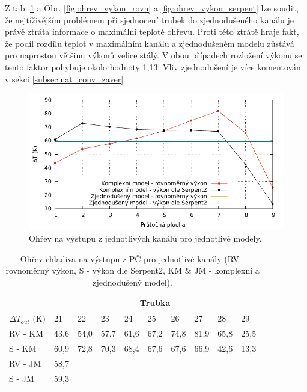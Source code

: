 Z tab. \ref{tab:ohrev_irt_nat_conv} a Obr. \ref{fig:ohrev_vykon_rovn} a \ref{fig:ohrev_vykon_serpent} lze soudit, že nejtíživějším problémem při sjednocení trubek do zjednodušeného kanálu je právě ztráta informace o maximální teplotě ohřevu. Proti této ztrátě hraje fakt, že podíl rozdílu teplot v maximálním kanálu a zjednodušeném modelu zůstává pro naprostou většinu výkonů velice stálý. V obou případech rozložení výkonu se tento faktor pohybuje okolo hodnoty 1,13.  Vliv zjednodušení je více komentován v sekci \ref{subsec:nat_conv_zaver}.
\begin{figure}[H]
	\centering
	\includegraphics[width=\textwidth]{./04_TH_model_IRT/grafy/deltaT_irt4m_8_trubka.pdf}
	\caption{Ohřev na výstupu z jednotlivých kanálů pro jednotlivé modely.}
	\label{fig:ohrev_kanal}
\end{figure}
\begin{table}[H]
	\centering
	\caption{Ohřev chladiva na výstupu z PČ pro jednotlivé kanály (RV - rovnoměrný výkon, S - výkon dle Serpent2, KM \& JM - komplexní a zjednodušený model).}
	\label{tab:ohrev_irt_nat_conv}
	\begin{tabular}{llllllllll}
		\hline
		& \multicolumn{9}{c}{Trubka} \\ \hline
			$\Delta T_{out}$ (K) & 21 & 22 & 23 & 24 & 25 & 26 & 27 & 28 & 29          \\ \hline
		RV - KM   & 43,6     & 54,0    & 57,7    & 61,6    & 67,2    & 74,8    & 81,9    & 65,8    & 25,5    \\
		 S - KM     & 60,9    & 72,8    & 70,3    & 68,4    & 67,6    & 67,6    & 66,9    & 42,6    & 13,3     \\
		 RV - JM   & 58,7    &          &          &          &          &          &          &          &                         \\
		 S - JM & 59,3    &          &          &          &          &          &          &          &          \\         \hline      
	\end{tabular}
\end{table}

